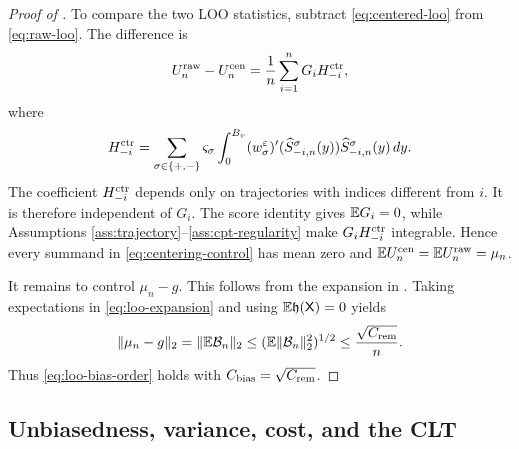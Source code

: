 \begin{proof}[Proof of ]
To compare the two LOO statistics, subtract \eqref{eq:centered-loo} from \eqref{eq:raw-loo}.  The difference is
\begin{equation}\label{eq:centering-control}
 U_n^{\rm raw}-U_n^{\rm cen}
 =\frac1n\sum_{i=1}^{n}G_i H_{-i}^{\rm ctr},
\end{equation}
where
\[
 H_{-i}^{\rm ctr}
 =\sum_{\sigma\in\{+,-\}}\varsigma_\sigma
 \int_0^{B_v}
 (w_\sigma^\varepsilon)'(\widehat S_{-i,n}^\sigma(y))
 \widehat S_{-i,n}^\sigma(y)\,dy.
\]
The coefficient $H_{-i}^{\rm ctr}$ depends only on trajectories with indices different from $i$.  It is therefore independent of $G_i$.  The score identity gives $\mathbb E G_i=0$, while Assumptions \ref{ass:trajectory}--\ref{ass:cpt-regularity} make $G_iH_{-i}^{\rm ctr}$ integrable.  Hence every summand in \eqref{eq:centering-control} has mean zero and
$\mathbb E U_n^{\rm cen}=\mathbb E U_n^{\rm raw}=\mu_n$.

It remains to control $\mu_n-g$.  This follows from the expansion in .  Taking expectations in \eqref{eq:loo-expansion} and using $\mathbb E\mathfrak h(\mathsf X)=0$ yields
\[
 \lVert\mu_n-g\rVert_2
 =\lVert\mathbb E \mathcal B_n\rVert_2
 \le(\mathbb E\lVert\mathcal B_n\rVert_2^2)^{1/2}
 \le\frac{\sqrt{C_{\rm rem}}}{n}.
\]
Thus \eqref{eq:loo-bias-order} holds with $C_{\rm bias}=\sqrt{C_{\rm rem}}$.
\end{proof}


\subsection{Unbiasedness, variance, cost, and the CLT}

